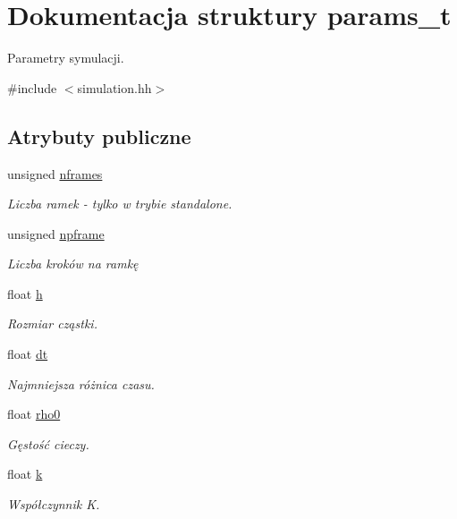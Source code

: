 \hypertarget{structparams__t}{\section{Dokumentacja struktury params\-\_\-t}
\label{structparams__t}
}


Parametry symulacji.  




{\ttfamily \#include $<$simulation.\-hh$>$}

\subsection*{Atrybuty publiczne}
\begin{DoxyCompactItemize}
\item 
unsigned \hyperlink{structparams__t_a2cecc28f4ca024657cf567047e2aba59}{nframes}
\begin{DoxyCompactList}\small\item\em Liczba ramek -\/ tylko w trybie standalone. \end{DoxyCompactList}\item 
unsigned \hyperlink{structparams__t_a06a1a567fd5ba13905514227e2bb710a}{npframe}
\begin{DoxyCompactList}\small\item\em Liczba kroków na ramkę \end{DoxyCompactList}\item 
float \hyperlink{structparams__t_a27d76064f2ae0cb93a0956027cfcc19b}{h}
\begin{DoxyCompactList}\small\item\em Rozmiar cząstki. \end{DoxyCompactList}\item 
float \hyperlink{structparams__t_a81fc6596e9b1446442ebf3eef2c3fb01}{dt}
\begin{DoxyCompactList}\small\item\em Najmniejsza różnica czasu. \end{DoxyCompactList}\item 
float \hyperlink{structparams__t_a2eb309edb681d0a998f23fc692a73781}{rho0}
\begin{DoxyCompactList}\small\item\em Gęstość cieczy. \end{DoxyCompactList}\item 
float \hyperlink{structparams__t_a97ee2783cf89cee1151be3250e9054b3}{k}
\begin{DoxyCompactList}\small\item\em Współczynnik K. \end{DoxyCompactList}\item 

\end{DoxyCompactItemize}
